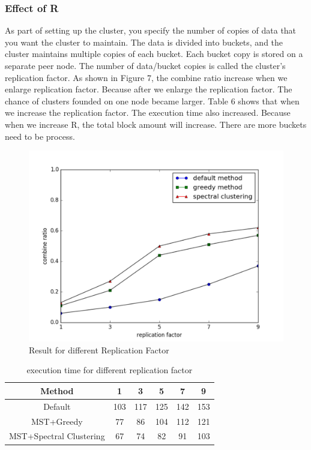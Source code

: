 \documentclass{vldb}
\begin{document}
\subsubsection{Effect of R}
As part of setting up the cluster, you specify the number of copies of data that you want the cluster to maintain. The data is divided into buckets, and the cluster maintains multiple copies of each bucket. Each bucket copy is stored on a separate peer node. The number of data/bucket copies is called the cluster's replication factor. As shown in Figure 7, the combine ratio increase when we enlarge replication factor. Because after we enlarge the replication factor. The chance of clusters founded on one node became larger. Table 6 shows that when we increase the replication factor. The execution time also increased. Because when we increase R, the total block amount will increase. There are more buckets need to be process.

\begin{figure}
\centering
\includegraphics[scale=0.45]{FReplicationFactor}
\caption{Result for different Replication Factor}
\label{fig:ReplicationFactor}
\end{figure}

\begin{table} 
\centering
\caption{execution time for different replication factor}
\label{tab:table}
\begin{tabular}{|c|c|c|c|c|c|} \hline
Method & 1 & 3 & 5 & 7 & 9 \\\hline
Default & 103 & 117 & 125 & 142 & 153\\\hline
MST+Greedy & 77 & 86 & 104 & 112 & 121 \\\hline
MST+Spectral Clustering & 67 & 74 & 82 & 91 & 103 \\\hline
\end{tabular}\\
\end{table}
\end{document}

